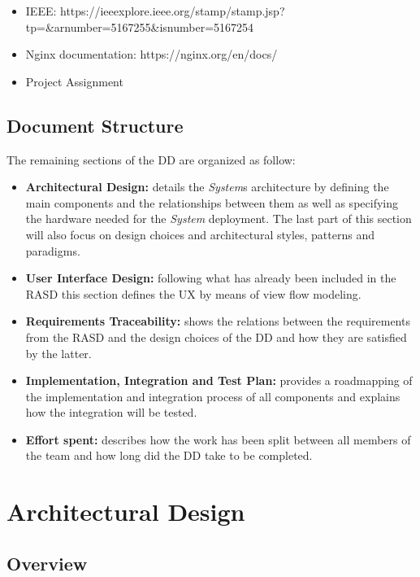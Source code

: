 \documentclass[titlepage]{article}
\begin{document}
	\begin{itemize}
		\item IEEE: https://ieeexplore.ieee.org/stamp/stamp.jsp?tp=\&arnumber=5167255\&isnumber=5167254
		\item Nginx documentation: https://nginx.org/en/docs/
		\item Project Assignment
	\end{itemize}
	
	
	\subsection{Document Structure}
	The remaining sections of the DD are organized as follow:
	\begin{itemize}
		\item {\bf Architectural Design: }details the {\it System}\textsc{}s architecture by defining the main components and the relationships between them as well as specifying the hardware needed for the {\it System} deployment. The last part of this section will also focus on design choices and architectural styles, patterns and paradigms.
		\item {\bf User Interface Design:  }following what has already been included in the RASD this section defines the UX by means of view flow modeling.
		\item {\bf Requirements Traceability: }shows the relations between the requirements from the RASD and the design choices of the DD and how they are satisfied by the latter.
		\item {\bf Implementation, Integration and Test Plan: }provides a roadmapping of the implementation and integration process of all components and explains how the integration will be tested.
		\item {\bf Effort spent: }describes how the work has been split between all members of the team and how long did the DD take to be completed.
	\end{itemize}
	\pagebreak
	
	
	
	\section{Architectural Design}
	\subsection{Overview}
	
\end{document}
